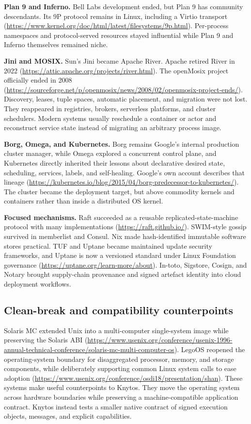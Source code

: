 \textbf{Plan 9 and Inferno.} Bell Labs development ended, but Plan 9 has
community descendants. Its 9P protocol remains in Linux, including a Virtio
transport (\url{https://www.kernel.org/doc/html/latest/filesystems/9p.html}).
Per-process namespaces and protocol-served resources stayed influential while
Plan 9 and Inferno themselves remained niche.

\textbf{Jini and MOSIX.} Sun's Jini became Apache River. Apache retired River
in 2022 (\url{https://attic.apache.org/projects/river.html}). The openMosix
project officially ended in 2008
(\url{https://sourceforge.net/p/openmosix/news/2008/02/openmosix-project-ends/}).
Discovery, leases, tuple spaces, automatic placement, and migration were not
lost. They reappeared in registries, brokers, serverless platforms, and
cluster schedulers. Modern systems usually reschedule a container or actor and
reconstruct service state instead of migrating an arbitrary process image.

\textbf{Borg, Omega, and Kubernetes.} Borg remains Google's internal
production cluster manager, while Omega explored a concurrent control plane, and
Kubernetes directly inherited their lessons about declarative desired state,
scheduling, services, labels, and self-healing. Google's own account describes
that lineage (\url{https://kubernetes.io/blog/2015/04/borg-predecessor-to-kubernetes/}).
The cluster became the deployment target, but above commodity kernels and
containers rather than inside a distributed OS kernel.

\textbf{Focused mechanisms.} Raft succeeded as a reusable 
replicated-state-machine protocol with many implementations (\url{https://raft.github.io/}).
SWIM-style gossip survived in memberlist and Consul. Nix made hash-identified
immutable software stores practical. TUF and Uptane became maintained update
security frameworks, and Uptane is now a versioned standard under Linux Foundation
governance (\url{https://uptane.org/learn-more/about}). In-toto, Sigstore,
Cosign, and Notary brought supply-chain provenance and signed artefact identity
into cloud deployment workflows.

\subsection{Clean-break and compatibility counterpoints}

Solaris MC extended Unix into a multi-computer single-system image while
preserving the Solaris ABI
(\url{https://www.usenix.org/conference/usenix-1996-annual-technical-conference/solaris-mc-multi-computer-os}).
LegoOS reopened the operating-system boundary for disaggregated processor,
memory, and storage components, while deliberately supporting common Linux
system calls to ease adoption
(\url{https://www.usenix.org/conference/osdi18/presentation/shan}). These
systems make useful counterpoints to Knytos. They move the operating
system across hardware boundaries while preserving a machine-compatible
application contract. Knytos instead tests a smaller native contract of
signed execution objects, messages, and explicit capabilities.

